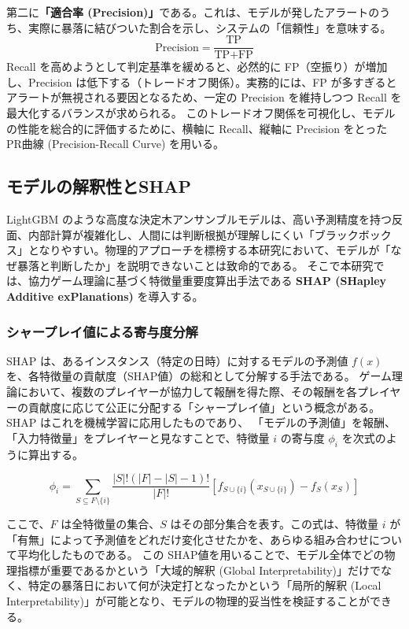 \documentclass[11pt,a4paper,oneside]{ltjsarticle}
\begin{document}
第二に\textbf{「適合率 (Precision)」}である。これは、モデルが発したアラートのうち、実際に暴落に結びついた割合を示し、システムの「信頼性」を意味する。
\begin{equation}
\text{Precision} = \frac{\text{TP}}{\text{TP} + \text{FP}}
\end{equation}
Recall を高めようとして判定基準を緩めると、必然的に FP（空振り）が増加し、Precision は低下する（トレードオフ関係）。実務的には、FP が多すぎるとアラートが無視される要因となるため、一定の Precision を維持しつつ Recall を最大化するバランスが求められる。
このトレードオフ関係を可視化し、モデルの性能を総合的に評価するために、横軸に Recall、縦軸に Precision をとった PR曲線 (Precision-Recall Curve) を用いる。

\subsection{モデルの解釈性とSHAP}
LightGBM のような高度な決定木アンサンブルモデルは、高い予測精度を持つ反面、内部計算が複雑化し、人間には判断根拠が理解しにくい「ブラックボックス」となりやすい。物理的アプローチを標榜する本研究において、モデルが「なぜ暴落と判断したか」を説明できないことは致命的である。
そこで本研究では、協力ゲーム理論に基づく特徴量重要度算出手法である \textbf{SHAP (SHapley Additive exPlanations)} を導入する。

\subsubsection{シャープレイ値による寄与度分解}
SHAP は、あるインスタンス（特定の日時）に対するモデルの予測値 $f(x)$ を、各特徴量の貢献度（SHAP値）の総和として分解する手法である。
ゲーム理論において、複数のプレイヤーが協力して報酬を得た際、その報酬を各プレイヤーの貢献度に応じて公正に分配する「シャープレイ値」という概念がある。SHAP はこれを機械学習に応用したものであり、
「モデルの予測値」を報酬、「入力特徴量」をプレイヤーと見なすことで、特徴量 $i$ の寄与度 $\phi_i$ を次式のように算出する。

\begin{equation}
\phi_i = \sum_{S \subseteq F \setminus \{i\}} \frac{|S|! (|F| - |S| - 1)!}{|F|!} [f_{S \cup \{i\}}(x_{S \cup \{i\}}) - f_S(x_S)]
\end{equation}

ここで、$F$ は全特徴量の集合、$S$ はその部分集合を表す。この式は、特徴量 $i$ が「有無」によって予測値をどれだけ変化させたかを、あらゆる組み合わせについて平均化したものである。
この SHAP値を用いることで、モデル全体でどの物理指標が重要であるかという「大域的解釈 (Global Interpretability)」だけでなく、特定の暴落日において何が決定打となったかという「局所的解釈 (Local Interpretability)」が可能となり、モデルの物理的妥当性を検証することができる。
\end{document}
